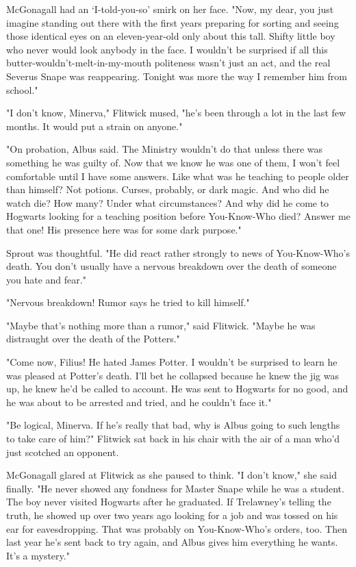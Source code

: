McGonagall had an `I-told-you-so' smirk on her face. "Now, my dear, you just imagine standing out there with the first years preparing for sorting and seeing those identical eyes on an eleven-year-old only about this tall. Shifty little boy who never would look anybody in the face. I wouldn't be surprised if all this butter-wouldn't-melt-in-my-mouth politeness wasn't just an act, and the real Severus Snape was reappearing. Tonight was more the way I remember him from school."

"I don't know, Minerva," Flitwick mused, "he's been through a lot in the last few months. It would put a strain on anyone."

"On probation, Albus said. The Ministry wouldn't do that unless there was something he was guilty of. Now that we know he was one of them, I won't feel comfortable until I have some answers. Like what was he teaching to people older than himself? Not potions. Curses, probably, or dark magic. And who did he watch die? How many? Under what circumstances? And why did he come to Hogwarts looking for a teaching position before You-Know-Who died? Answer me that one! His presence here was for some dark purpose."

Sprout was thoughtful. "He did react rather strongly to news of You-Know-Who's death. You don't usually have a nervous breakdown over the death of someone you hate and fear."

"Nervous breakdown! Rumor says he tried to kill himself."

"Maybe that's nothing more than a rumor," said Flitwick. "Maybe he was distraught over the death of the Potters."

"Come now, Filius! He hated James Potter. I wouldn't be surprised to learn he was pleased at Potter's death. I'll bet he collapsed because he knew the jig was up, he knew he'd be called to account. He was sent to Hogwarts for no good, and he was about to be arrested and tried, and he couldn't face it."

"Be logical, Minerva. If he's really that bad, why is Albus going to such lengths to take care of him?" Flitwick sat back in his chair with the air of a man who'd just scotched an opponent.

McGonagall glared at Flitwick as she paused to think. "I don't know," she said finally. "He never showed any fondness for Master Snape while he was a student. The boy never visited Hogwarts after he graduated. If Trelawney's telling the truth, he showed up over two years ago looking for a job and was tossed on his ear for eavesdropping. That was probably on You-Know-Who's orders, too. Then last year he's sent back to try again, and Albus gives him everything he wants. It's a mystery."

